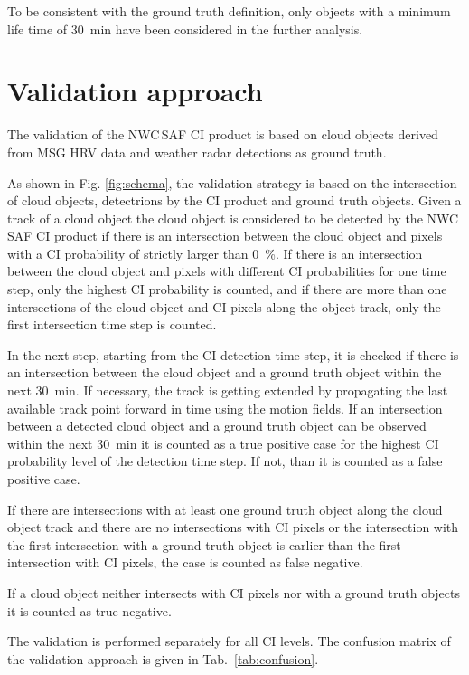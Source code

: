 To be consistent with the ground truth definition, only objects with a minimum life time of \SI{30}{\minute} have been considered in the further analysis.

\section{Validation approach}
\label{sec:validation}
The validation of the NWC\,SAF CI product  is based on cloud objects derived from MSG HRV data and weather radar detections as ground truth.

As shown in Fig. \ref{fig:schema}, the validation strategy is based on the intersection of cloud objects, detectrions by the CI product and ground truth objects. Given a track of a cloud object the cloud object is considered to be detected by the NWC\,SAF CI product if there is an intersection between the cloud object and pixels with a CI probability of strictly larger than \SI{0}{\percent}. If there is an intersection between the cloud object and pixels with different CI probabilities for one time step, only the highest CI probability is counted, and if there are more than one intersections of the cloud object and CI pixels along the object track, only the first intersection time step is counted. 

In the next step, starting from the CI detection time step, it is checked if there is an intersection between the cloud object and a ground truth object within the next \SI{30}{\minute}. If necessary, the track is getting extended by propagating the last available track point forward in time using the motion fields. If an intersection between a detected cloud object and a ground truth object can be observed within the next \SI{30}{\minute} it is counted as a true positive case for the highest CI probability level of the detection time step. If not, than it is counted as a false positive case.

If there are intersections with at least one ground truth object along the cloud object track and there are no intersections with CI pixels or the intersection with the first intersection with a ground truth object is earlier than the first intersection with CI pixels, the case is counted as false negative.

If a cloud object neither intersects with CI pixels nor with a ground truth objects it is counted as true negative.

The validation is performed separately for all CI levels. The confusion matrix of the validation approach is given in Tab.~\ref{tab:confusion}.

